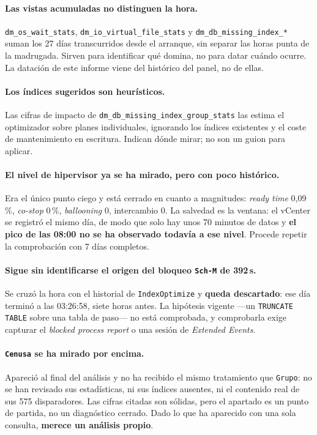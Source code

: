 \documentclass[11pt,a4paper]{article}
\newcommand{\cod}[1]{\texttt{\small #1}}
\begin{document}
\paragraph{Las vistas acumuladas no distinguen la hora.}
\cod{dm\_os\_wait\_stats}, \cod{dm\_io\_virtual\_file\_stats} y
\cod{dm\_db\_missing\_index\_*} suman los 27 días transcurridos desde el
arranque, sin separar las horas punta de la madrugada. Sirven para
identificar qué domina, no para datar cuándo ocurre. La datación de este
informe viene del histórico del panel, no de ellas.

\paragraph{Los índices sugeridos son heurísticos.} Las cifras de impacto de
\cod{dm\_db\_missing\_index\_group\_stats} las estima el optimizador sobre
planes individuales, ignorando los índices existentes y el coste de
mantenimiento en escritura. Indican dónde mirar; no son un guion para
aplicar.

\paragraph{El nivel de hipervisor ya se ha mirado, pero con poco histórico.}
Era el único punto ciego y está cerrado en cuanto a magnitudes: \emph{ready
time} 0,09\,\%, \emph{co-stop} 0\,\%, \emph{ballooning} 0, intercambio 0. La
salvedad es la ventana: el vCenter se registró el mismo día, de modo que solo
hay unos 70 minutos de datos y \textbf{el pico de las 08:00 no se ha observado
todavía a ese nivel}. Procede repetir la comprobación con 7 días completos.

\paragraph{Sigue sin identificarse el origen del bloqueo \cod{Sch-M} de
392\,s.} Se cruzó la hora con el historial de \cod{IndexOptimize} y
\textbf{queda descartado}: ese día terminó a las 03:26:58, siete horas antes.
La hipótesis vigente —un \cod{TRUNCATE TABLE} sobre una tabla de paso— no
está comprobada, y comprobarla exige capturar el \emph{blocked process
report} o una sesión de \emph{Extended Events}.

\paragraph{\cod{Cenusa} se ha mirado por encima.} Apareció al final del
análisis y no ha recibido el mismo tratamiento que \cod{Grupo}: no se han
revisado sus estadísticas, ni sus índices ausentes, ni el contenido real de
sus 575 disparadores. Las cifras citadas son sólidas, pero el apartado es un
punto de partida, no un diagnóstico cerrado. Dado lo que ha aparecido con una
sola consulta, \textbf{merece un análisis propio}.
\end{document}
